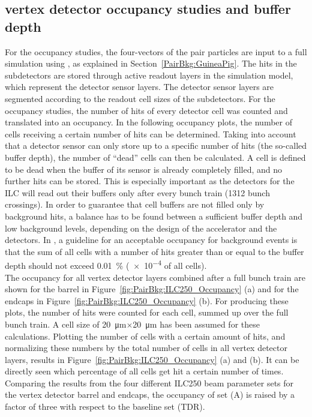 \subsection{\sid vertex detector occupancy studies and buffer depth}
\label{PairBkg:occupancy}
For the occupancy studies, the \guineapig four-vectors of the pair particles are input to a full \sid simulation using \slic, as explained in Section~\ref{PairBkg:GuineaPig}.
The hits in the \sid subdetectors are stored through active readout layers in the simulation model, which represent the detector sensor layers.
The detector sensor layers are segmented according to the readout cell sizes of the \sid subdetectors.
For the occupancy studies, the number of hits of every detector cell was counted and translated into an occupancy.
In the following occupancy plots, the number of cells receiving a certain number of hits can be determined.
Taking into account that a detector sensor can only store up to a specific number of hits (the so-called buffer depth), the number of ``dead'' cells can then be calculated.
A cell is defined to be dead when the buffer of its sensor is already completely filled, and no further hits can be stored.
This is especially important as the detectors for the ILC will read out their buffers only after every bunch train (\num{1312} bunch crossings).
In order to guarantee that cell buffers are not filled only by background hits, a balance has to be found between a sufficient buffer depth and low background levels, depending on the design of the accelerator and the detectors.
In \sid, a guideline for an acceptable occupancy for background events is that the sum of all cells with a number of hits greater than or equal to the buffer depth should not exceed \SI{0.01}{\percent} (\num{e-4} of all cells).\\
The occupancy for all vertex detector layers combined after a full bunch train are shown for the barrel in Figure~\ref{fig:PairBkg:ILC250_Occupancy} (a) and for the endcaps in Figure~\ref{fig:PairBkg:ILC250_Occupancy} (b).
For producing these plots, the number of hits were counted for each cell, summed up over the full bunch train.
A cell size of \SI{20}{\micro\meter}$\times$\SI{20}{\micro\meter} has been assumed for these calculations.
Plotting the number of cells with a certain amount of hits, and normalizing these numbers by the total number of cells in all vertex detector layers, results in Figure~\ref{fig:PairBkg:ILC250_Occupancy} (a) and (b).
It can be directly seen which percentage of all cells get hit a certain number of times.
Comparing the results from the four different ILC250 beam parameter sets for the vertex detector barrel and endcaps, the occupancy of set (A) is raised by a factor of three with respect to the baseline set (TDR).

